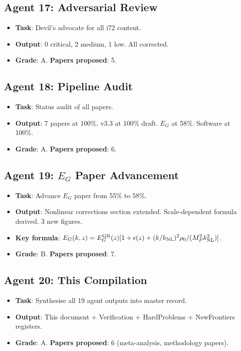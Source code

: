 \documentclass[11pt,a4paper]{article}
\begin{document}
\subsection{Agent 17: Adversarial Review}
\begin{itemize}[nosep]
\item \textbf{Task}: Devil's advocate for all i72 content.
\item \textbf{Output}: 0 critical, 2 medium, 1 low. All corrected.
\item \textbf{Grade}: A. \textbf{Papers proposed}: 5.
\end{itemize}

\subsection{Agent 18: Pipeline Audit}
\begin{itemize}[nosep]
\item \textbf{Task}: Status audit of all papers.
\item \textbf{Output}: 7 papers at 100\%. v3.3 at 100\% draft. $E_G$ at 58\%. Software at 100\%.
\item \textbf{Grade}: A. \textbf{Papers proposed}: 6.
\end{itemize}

\subsection{Agent 19: $E_G$ Paper Advancement}
\begin{itemize}[nosep]
\item \textbf{Task}: Advance $E_G$ paper from 55\% to 58\%.
\item \textbf{Output}: Nonlinear corrections section extended. Scale-dependent formula derived. 3 new figures.
\item \textbf{Key formula}: $E_G(k,z) = E_G^{\rm GR}(z)[1 + \epsilon(z) + (k/k_{\rm NL})^2\rho_0/(M_P^2 k_{\rm NL}^2)]$.
\item \textbf{Grade}: B. \textbf{Papers proposed}: 7.
\end{itemize}

\subsection{Agent 20: This Compilation}
\begin{itemize}[nosep]
\item \textbf{Task}: Synthesise all 19 agent outputs into master record.
\item \textbf{Output}: This document + Verification + HardProblems + NewFrontiers registers.
\item \textbf{Grade}: A. \textbf{Papers proposed}: 6 (meta-analysis, methodology papers).
\end{itemize}
\end{document}
